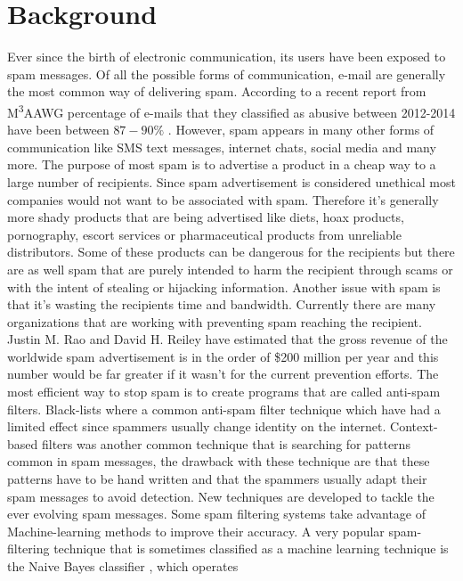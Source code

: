 
\section{Background}

Ever since the birth of electronic communication, its users have been exposed
to spam messages. Of all the possible forms of communication, e-mail are
generally the most common way of delivering spam. 
According to a recent report from M\textsuperscript{3}AAWG percentage of
e-mails that they classified as abusive between 2012-2014 have been between
$87-90\%$ \cite{M3AAWG2014}.  However, spam appears in many other forms of
communication like SMS text messages, internet chats, social media and many
more. The purpose of most spam is to advertise a product in a cheap way to a
large number of recipients. Since spam advertisement is considered unethical
most companies would not want to be associated with spam.  Therefore it's
generally more shady products that are being advertised like diets, hoax
products, pornography, escort services or pharmaceutical products from
unreliable distributors\cite{wikipedia}. Some of these products can be
dangerous for the recipients but there are as well spam that are purely
intended to harm the recipient through scams or with the intent of stealing or
hijacking information.  Another issue with spam is that it's wasting the
recipients time and bandwidth. Currently there are many organizations that are
working with preventing spam reaching the recipient.  Justin M. Rao and David
H. Reiley \cite{rao2012economics} have estimated that the gross revenue of the
worldwide spam advertisement is in the order of \$200 million per year and this
number would be far greater if it wasn't for the current prevention efforts.
The most efficient way to stop spam is to create programs that are called
anti-spam filters. Black-lists where a common anti-spam filter technique which
have had a limited effect since spammers usually change identity on the
internet.  Context-based filters was another common technique that is searching
for patterns common in spam messages, the drawback with these technique are
that these patterns have to be hand written and that the spammers usually adapt
their spam messages to avoid detection. New techniques are developed to tackle
the ever evolving spam messages.\cite{spam-techniques} Some spam filtering
systems take advantage of Machine-learning methods to improve their accuracy. A
very popular spam-filtering technique that is sometimes classified as a machine
learning technique is the Naive Bayes classifier \cite{bayes}, which operates

